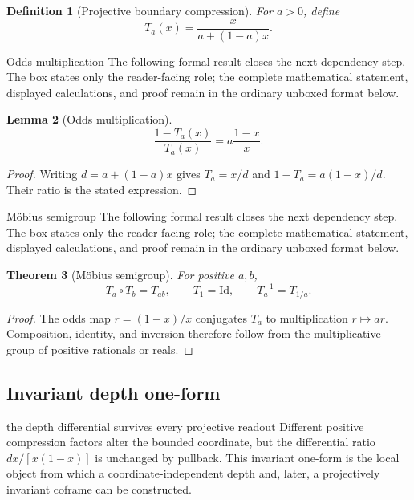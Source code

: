 \documentclass[11pt]{article}
\numberwithin{equation}{section}
\newtheorem{definition}{Definition}[section]
\newtheorem{lemma}[definition]{Lemma}
\newtheorem{theorem}[definition]{Theorem}
\theoremstyle{remark}
\newcommand{\Id}{\mathrm{Id}}
\begin{document}
\begin{definition}[Projective boundary compression]
For $a>0$, define
\begin{equation}
T_a(x)=\frac{x}{a+(1-a)x}.
\end{equation}
\end{definition}

\begin{proofguide}{Odds multiplication}
The following formal result closes the next dependency step. The box states only the reader-facing role; the complete mathematical statement, displayed calculations, and proof remain in the ordinary unboxed format below.
\end{proofguide}
\begin{lemma}[Odds multiplication]
\begin{equation}
\frac{1-T_a(x)}{T_a(x)}=a\frac{1-x}{x}.
\end{equation}
\end{lemma}
\begin{proof}
Writing $d=a+(1-a)x$ gives $T_a=x/d$ and $1-T_a=a(1-x)/d$. Their ratio is the stated expression.
\end{proof}

\begin{proofguide}{M\"obius semigroup}
The following formal result closes the next dependency step. The box states only the reader-facing role; the complete mathematical statement, displayed calculations, and proof remain in the ordinary unboxed format below.
\end{proofguide}
\begin{theorem}[M\"obius semigroup]
For positive $a,b$,
\begin{equation}
T_a\circ T_b=T_{ab},\qquad T_1=\Id,\qquad T_a^{-1}=T_{1/a}.
\end{equation}
\end{theorem}
\begin{proof}
The odds map $r=(1-x)/x$ conjugates $T_a$ to multiplication $r\mapsto ar$. Composition, identity, and inversion therefore follow from the multiplicative group of positive rationals or reals.
\end{proof}

\subsection{Invariant depth one-form}
\begin{interpretivebridge}{the depth differential survives every projective readout}
Different positive compression factors alter the bounded coordinate, but the differential ratio $dx/[x(1-x)]$ is unchanged by pullback. This invariant one-form is the local object from which a coordinate-independent depth and, later, a projectively invariant coframe can be constructed.
\end{interpretivebridge}
\end{document}
